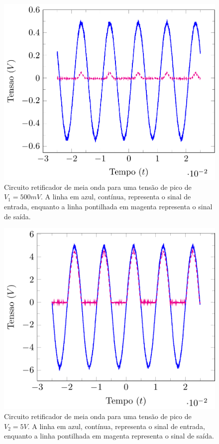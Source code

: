 \documentclass[12pt,a4paper]{article}
\begin{document}
\begin{figure}[htpb]
  \centering
  \includegraphics[width=0.8\linewidth]{./retificador_meio.pdf}
  \caption{Circuito retificador de meia onda para uma tensão de pico de $V_1=500mV$. A linha em azul, contínua, representa o sinal de entrada, enquanto a linha pontilhada em magenta representa o sinal de saída.}
  \label{fig:retifi}
\end{figure}
\begin{figure}[htpb]
\centering
\includegraphics[width=0.8\linewidth]{./retificador_5.pdf}
  \caption{Circuito retificador de meia onda para uma tensão de pico de $V_2=5V$. A linha em azul, contínua, representa o sinal de entrada, enquanto a linha pontilhada em magenta representa o sinal de saída.}
\label{fig:}
\end{figure}
\end{document}
